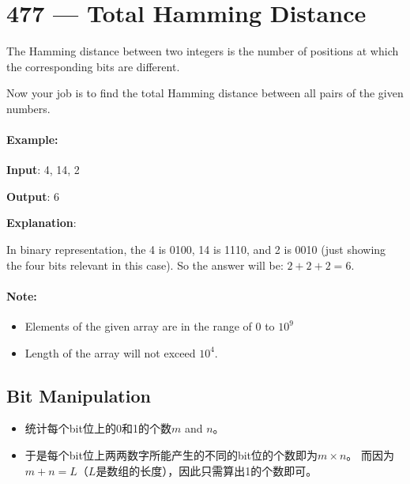 \section{477 --- Total Hamming Distance}
The Hamming distance between two integers is the number of positions at which the corresponding bits are different.

Now your job is to find the total Hamming distance between all pairs of the given numbers.

\paragraph{Example:}
\begin{flushleft}

\textbf{Input}: 4, 14, 2

\textbf{Output}: 6

\textbf{Explanation}: 

In binary representation, the 4 is 0100, 14 is 1110, and 2 is 0010 (just
showing the four bits relevant in this case). So the answer will be: $2 + 2 + 2 = 6$.


\end{flushleft}
\paragraph{Note:}

\begin{itemize}
\item Elements of the given array are in the range of 0 to $10^9$
\item Length of the array will not exceed $10^4$.
\end{itemize}

\subsection{Bit Manipulation}
\begin{itemize}
\item 统计每个bit位上的0和1的个数$m$ and $n$。
\item 于是每个bit位上两两数字所能产生的不同的bit位的个数即为$m\times n$。 而因为$m+n=L$（$L$是数组的长度），因此只需算出1的个数即可。
\end{itemize}


